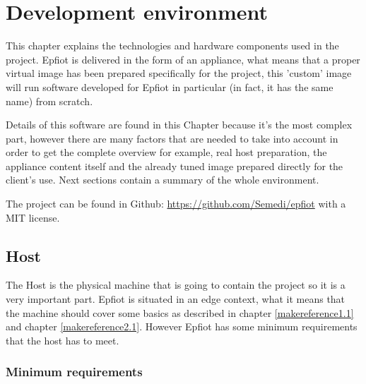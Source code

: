 
\cleardoublepage


\chapter{Development environment}
\label{makereference3}

This chapter explains the technologies and hardware components used in the project. Epfiot is delivered in the form of an appliance, what means that a proper virtual image  has been prepared specifically for the project, this 'custom' image will run software developed for Epfiot in particular (in fact, it has the same name) from scratch.

Details of this software are found in this Chapter because it's the most complex part, however there are many factors that are needed to take into account in order to get the complete overview for example, real host preparation, the appliance content itself and the already tuned image prepared directly for the client's use. Next sections contain a summary of the whole environment.

The project can be found in Github: \url{https://github.com/Semedi/epfiot} with a MIT license.

\section{Host}
\label{makereference3.1}

The Host is the physical machine that is going to contain the project so it is a very important part. Epfiot is situated in an edge context, what it means that the machine should cover some basics as described in chapter \ref{makereference1.1} and chapter \ref{makereference2.1}. However Epfiot has some minimum requirements that the host has to meet.

\newpage
\subsection{Minimum requirements}
\label{makereference3.1.1}

